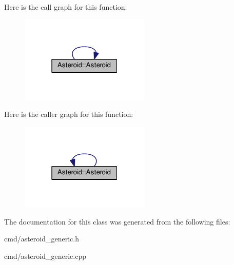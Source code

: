 Here is the call graph for this function\+:
\nopagebreak
\begin{figure}[H]
\begin{center}
\leavevmode
\includegraphics[width=175pt]{d6/d21/classAsteroid_affc6fbe47011026956bc189608260c5f_cgraph}
\end{center}
\end{figure}




Here is the caller graph for this function\+:
\nopagebreak
\begin{figure}[H]
\begin{center}
\leavevmode
\includegraphics[width=175pt]{d6/d21/classAsteroid_affc6fbe47011026956bc189608260c5f_icgraph}
\end{center}
\end{figure}




The documentation for this class was generated from the following files\+:\begin{DoxyCompactItemize}
\item 
cmd/asteroid\+\_\+generic.\+h\item 
cmd/asteroid\+\_\+generic.\+cpp\end{DoxyCompactItemize}
